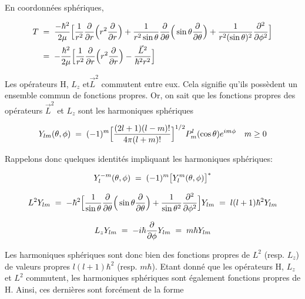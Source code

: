 En coordonnées sphériques, 

\begin{align*}
    T&\; = \; 
    \dfrac{-\hbar^2}{2\mu}\Big[\dfrac{1}{r^2}\dfrac{\partial}{\partial r}\Big(r^2\dfrac{\partial}{\partial r}\Big)+\dfrac{1}{r^2\sin{\theta}}\dfrac{\partial}{\partial \theta}\Big(\sin{\theta}\dfrac{\partial}{\partial \theta}\Big)+\dfrac{1}{r^2(\sin{\theta})^2}\dfrac{\partial ^2}{\partial\phi^2}\Big]\\
    &\; = \;-\dfrac{\hbar^2}{2\mu}\Big[\dfrac{1}{r^2}\dfrac{\partial}{\partial r}\Big(r^2\dfrac{\partial}{\partial r}\Big)-\dfrac{\Vec{L}^2}{\hbar^2r^2}\Big]
\end{align*}

\vspace{0.2cm}

Les opérateurs H, $L_z$ et$\Vec{L}^2$ commutent entre eux. Cela signifie qu'ils possèdent un ensemble commun de fonctions propres. Or, on sait que les fonctions propres des opérateurs $\Vec{L}^2$ et $L_z$ sont les harmoniques sphériques

\begin{align*}
    Y_{lm}(\theta, \phi) \; = \; (-1)^m \Big[ \dfrac{(2l+1)(l-m)!}{4\pi(l+m)!}\Big]^{1/2} P^{l}_{m}(\cos{\theta})e^{im\phi} \quad m\ge0
\end{align*}

\vspace{0.2cm}

Rappelons donc quelques identités impliquant les harmoniques sphériques: 

\vspace{0.2cm}

\begin{equation*}
    Y_{l}^{-m}(\theta, \phi)\; = \; (-1)^m\big[Y_{l}^{m}(\theta, \phi)\big]^{*}
\end{equation*}

\begin{equation*}
    L^2Y_{lm}\; = \;-\hbar^2 \Big[\dfrac{1}{\sin{\theta}}\dfrac{\partial}{\partial\theta}\Big(\sin{\theta}\dfrac{\partial}{\partial\theta}\Big)+\dfrac{1}{\sin{\theta}^2}\dfrac{\partial^2}{\partial\phi^2}\Big]Y_{lm}\; = \; l(l+1)\hbar^2Y_{lm}
\end{equation*}

\begin{equation*}
    L_zY_{lm}\; = \;-i\hbar\dfrac{\partial}{\partial\phi}Y_{lm}\; = \; m\hbar Y_{lm}
\end{equation*}

Les harmoniques sphériques sont donc bien des fonctions propres de $L^2$ (resp. $L_z$) de valeurs propres $l(l+1)\hbar^2$ (resp. $m\hbar$). Etant donné que les opérateurs H, $L_z$ et $L^2$ commutent, les harmoniques sphériques sont également fonctions propres de H. Ainsi, ces dernières sont forcément de la forme 

